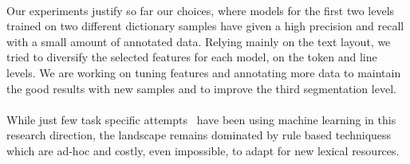 \documentclass[twocolumn,a4paper]{article}
\begin{document}
\paragraph{}Our experiments justify so far our choices, where models for the first two levels trained on two different dictionary samples have given a high precision and recall with a small amount of annotated data. Relying mainly on the text layout, we tried to diversify the selected features for each model, on the token and line levels. We are working on tuning features and annotating more data to maintain the good results with new samples and to improve the third segmentation level.

 
\paragraph{}While just few task specific attempts~\cite{bago2015using} have been using machine learning in this research direction, the landscape remains dominated by rule based techniquess~\cite{khemakhem2009towards,fahmy2014towards,mykowiecka2012building} which are ad-hoc and costly, even impossible, to adapt for new lexical resources.
	




\end{document}
